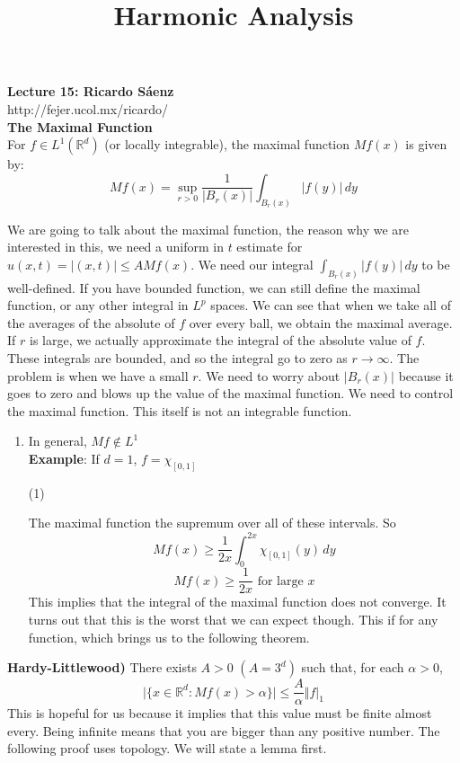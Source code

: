 \documentclass[12pt]{article}
\title{Harmonic Analysis}
\begin{document}
\noindent \textbf{Lecture 15: Ricardo S\'aenz} \\
\noindent http://fejer.ucol.mx/ricardo/ \\

\noindent \textbf{The Maximal Function} \\
\noindent For $f \in L^1(\mathbb{R}^d)$ (or locally integrable), the maximal function $Mf(x)$ is given by:
$$ Mf(x) = \sup_{r>0}\frac{1}{\vert B_r(x)\vert} \int_{B_r(x)} \vert f(y) \vert \,dy$$

\noindent We are going to talk about the maximal function, the reason why we are interested in this, we need a uniform in $t$ estimate for $u(x,t) = \vert (x,t) \vert \leq A Mf(x)$. We need our integral $\int_{B_r(x)} \vert f(y)\vert  \,dy$ to be well-defined. If you have bounded function, we can still define the maximal function, or any other integral in $L^p$ spaces. We can see that when we take all of the averages of the absolute of $f$ over every ball, we obtain the maximal average. If $r$ is large, we actually approximate the integral of the absolute value of $f$. These integrals are bounded, and so the integral go to zero as $r \rightarrow \infty$. The problem is when we have a small $r$. We need to worry about $\vert B_r(x) \vert$ because it goes to zero and blows up the value of the maximal function. We need to control the maximal function. This itself is not an integrable function. 

\begin{enumerate}
\item In general, $Mf \not \in L^1$ \\
\textbf{Example}: If $d = 1$, $f = \chi_{[0,1]}$

(1)

The maximal function the supremum over all of these intervals. So 
$$Mf(x) \geq \frac{1}{2x}\int^{2x}_0 \chi_{[0,1]}(y) \,dy$$
$$Mf(x) \geq \frac{1}{2x} \text{ for large } x$$
This implies that the integral of the maximal function does not converge. It turns out that this is the worst that we can expect though. This if for any function, which brings us to the following theorem.
\end{enumerate}

\noindent \textbf{Hardy-Littlewood)} There exists $A>0$ $(A=3^d)$ such that, for each $\alpha>0$,
$$\vert \{ x \in \mathbb{R}^d : Mf(x) > \alpha\}\vert \leq \frac{A}{\alpha}\Vert f \vert_1 $$
This is hopeful for us because it implies that this value must be finite almost every. Being infinite means that you are bigger than any positive number. The following proof uses topology. We will state a lemma first.  \\
\end{document}
